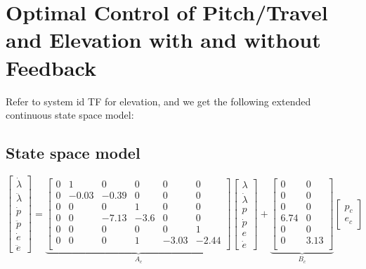 \section{Optimal Control of Pitch/Travel and Elevation with and without Feedback}\label{sec:prob4}

Refer to system id TF for elevation, and we get the following extended continuous state space model:

\subsection{State space model}
\begin{equation}
	\begin{bmatrix}
		\dot{\lambda}\\
		\ddot{\lambda}	\\
		\dot{p}	\\
		\ddot{p}\\
		\dot{e}	\\
		\ddot{e}
	\end{bmatrix} = 
	\underbrace{
	\begin{bmatrix}
		0 & 1 & 0 & 0 & 0  & 0 \\
		0 & -0.03 & -0.39 & 0 & 0 & 0 \\
		0 & 0 & 0 & 1 & 0 & 0 \\
		0 & 0 & -7.13 & -3.6 & 0 & 0 \\
		0 & 0 & 0 & 0 & 0 & 1 \\
		0 & 0 & 0 & 1 & -3.03 & -2.44 \\
	\end{bmatrix}}_{A_c}
	\begin{bmatrix}
		\lambda	\\
		\dot{\lambda}\\
		p		\\
		\dot{p} \\
		e		\\
		\dot{e}
	\end{bmatrix} +
	\underbrace{
	\begin{bmatrix}
		0 & 0\\
		0 & 0\\
		0 & 0\\
		6.74 & 0\\
		0 & 0 \\
		0 & 3.13 \\
	\end{bmatrix}}_{B_c}
	\begin{bmatrix}
	p_c \\
	e_c
	\end{bmatrix}
	\label{eq:ex_sys}
\end{equation}

